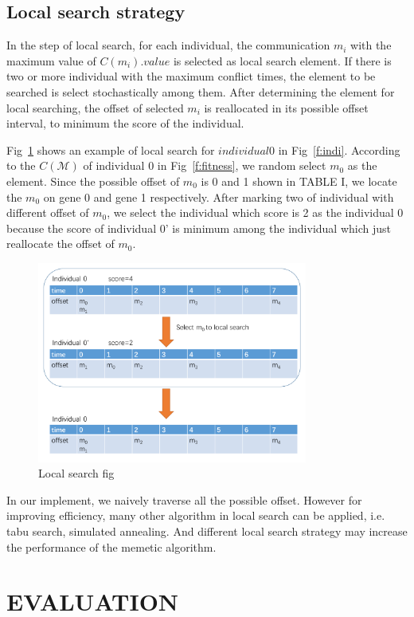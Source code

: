 \documentclass[conference]{IEEEtran}
\begin{document}
\subsection{Local search strategy}

In the step of local search, for each individual, the communication $m_i$ with the maximum value of $C(m_i).value$ is selected as local search element. If there is two or more individual with the maximum conflict times, the element to be searched is select stochastically among them. After determining the element for local searching, the offset of selected $m_i$ is reallocated in its possible offset interval, to minimum the score of the individual.

Fig~\ref{f:local} shows an example of local search for $individual 0$ in Fig~\ref{f:indi}. According to the $C(\mathcal{M})$ of individual 0 in Fig~\ref{f:fitness}, we random select $m_0$ as the element. Since the possible offset of $m_0$ is 0 and 1 shown in TABLE I, we locate the $m_0$ on gene 0 and gene 1 respectively. After marking two of individual with different offset of $m_0$, we select the individual which score is 2 as the individual 0 because the score of individual 0' is minimum among the individual which just reallocate the offset of $m_0$.
\begin{figure}[!t]
	\centering
	\includegraphics[width=3.5in]{picture/local.pdf}
	\caption{Local search fig}
	\label{f:local}
\end{figure}

In our implement, we naively traverse all the possible offset. However for improving efficiency, many other algorithm in local search can be applied, i.e. tabu search, simulated annealing. And different local search strategy may increase the performance of the memetic algorithm.

\section{EVALUATION}
\end{document}
